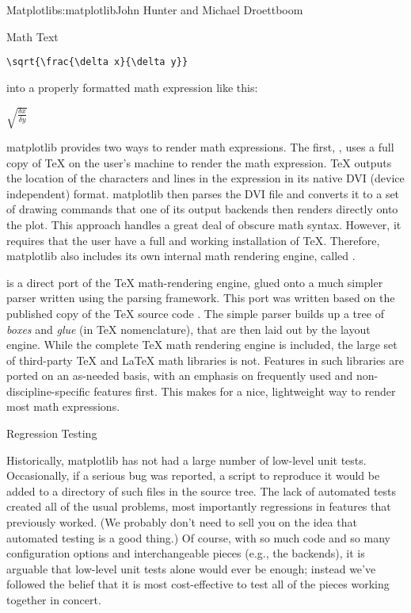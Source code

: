 \begin{aosachapter}{Matplotlib}{s:matplotlib}{John Hunter and Michael Droettboom}
\begin{aosasect1}{Math Text}
\begin{verbatim}
\sqrt{\frac{\delta x}{\delta y}}
\end{verbatim}

\noindent into a properly formatted math expression like this:

\vspace{10px}
$\sqrt{\frac{\delta x}{\delta y}}$
\vspace{10px}

matplotlib provides two ways to render math expressions.  The first,
, uses a full copy of TeX on the user's machine to render the
math expression.  TeX outputs the location of the characters and
lines in the expression in its native DVI (device independent) format.
matplotlib then parses the DVI file and converts it to a set of
drawing commands that one of its output backends then renders directly
onto the plot.  This approach handles a great deal of obscure math
syntax. However, it requires that the user have a full and working
installation of TeX.  Therefore, matplotlib also includes its own
internal math rendering engine, called .

 is a direct port of the TeX math-rendering engine, glued
onto a much simpler parser written using the 
\cite{bib:pyparsing} parsing framework.  This port was written based
on the published copy of the TeX source code \cite{bib:texprogram}.
The simple parser builds up a tree of \emph{boxes} and \emph{glue} (in TeX
nomenclature), that are then laid out by the layout engine.  While the
complete TeX math rendering engine is included, the large set of
third-party TeX and LaTeX math libraries is not.  Features in such
libraries are ported on an as-needed basis, with an emphasis on
frequently used and non-discipline-specific features first.  This
makes for a nice, lightweight way to render most math expressions.

\end{aosasect1}

\begin{aosasect1}{Regression Testing}

Historically, matplotlib has not had a large number of low-level
unit tests.  Occasionally, if a serious bug was reported, a script
to reproduce it would be added to a directory of such files in the
source tree.  The lack of automated tests created all of the usual
problems, most importantly regressions in features that previously
worked.  (We probably don't need to sell you on the idea that
automated testing is a good thing.)  Of course, with so much code
and so many configuration options and interchangeable pieces
(e.g., the backends), it is arguable that low-level unit tests alone
would ever be enough; instead we've followed the belief that it is
most cost-effective to test all of the pieces working together in
concert.


\end{aosasect1}
\end{aosachapter}
